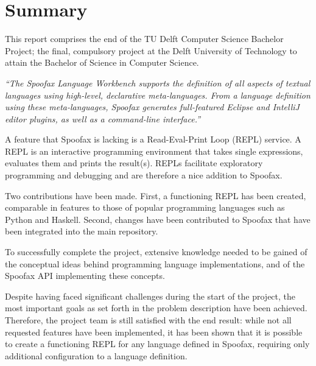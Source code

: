 \chapter{Summary}
\label{cha:summary}

This report comprises the end of the TU Delft Computer Science Bachelor Project;
the final, compulsory project at the Delft University of Technology to attain
the Bachelor of Science in Computer Science.

\textit{``The Spoofax Language Workbench supports the definition of all aspects
of textual languages using high-level, declarative meta-languages. From a
language definition using these meta-languages, Spoofax generates full-featured
Eclipse and IntelliJ editor plugins, as well as a command-line interface.''}

A feature that Spoofax is lacking is a Read-Eval-Print Loop (REPL) service. A
REPL is an interactive programming environment that takes single expressions,
evaluates them and prints the result(s). REPLs facilitate exploratory
programming and debugging and are therefore a nice addition to Spoofax.

Two contributions have been made. First, a functioning REPL has been created,
comparable in features to those of popular programming languages such as Python
and Haskell. Second, changes have been contributed to Spoofax that have been
integrated into the main repository.

To successfully complete the project, extensive knowledge needed to be gained of
the conceptual ideas behind programming language implementations, and of the
Spoofax API implementing these concepts.

Despite having faced significant challenges during the start of the project, the
most important goals as set forth in the problem description have been achieved.
Therefore, the project team is still satisfied with the end result: while
not all requested features have been implemented, it has been shown that it is
possible to create a functioning REPL for any language defined in Spoofax,
requiring only additional configuration to a language definition.

